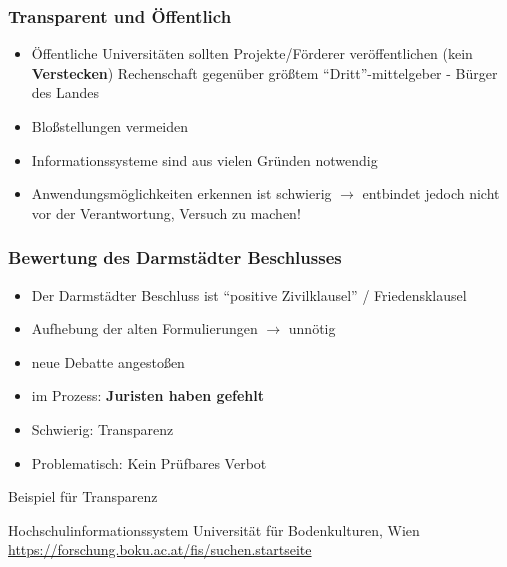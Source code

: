 \documentclass[presentation]{beamer}
\providecommand{\alert}[1]{\textbf{#1}}
\begin{document}
\begin{frame}
\frametitle{Transparent und Öffentlich}
\label{sec-3-5}

\begin{itemize}
\item Öffentliche Universitäten sollten Projekte/Förderer veröffentlichen (kein \alert{Verstecken})
     Rechenschaft gegenüber größtem ``Dritt''-mittelgeber - Bürger des Landes
\item Bloßstellungen vermeiden
\item Informationssysteme sind aus vielen Gründen notwendig
\item Anwendungsmöglichkeiten erkennen ist schwierig\newline
     \(\rightarrow\) entbindet jedoch nicht vor der Verantwortung, Versuch zu machen!
\end{itemize}
\end{frame}
\begin{frame}
\frametitle{Bewertung des Darmstädter Beschlusses}
\label{sec-3-6}


\begin{itemize}
\item Der Darmstädter Beschluss ist ``positive Zivilklausel'' / Friedensklausel
\item Aufhebung der alten Formulierungen \(\rightarrow\) unnötig
\item neue Debatte angestoßen
\item im Prozess: \alert{Juristen haben gefehlt}
\item Schwierig: Transparenz
\item Problematisch: Kein Prüfbares Verbot
\end{itemize}
\begin{block}{Beispiel für Transparenz}
\label{sec-3-6-1}

    Hochschulinformationssystem Universität für Bodenkulturen, Wien\\
    \href{https://forschung.boku.ac.at/fis/suchen.startseite}{https://forschung.boku.ac.at/fis/suchen.startseite}
\end{block}
\end{frame}
\end{document}
